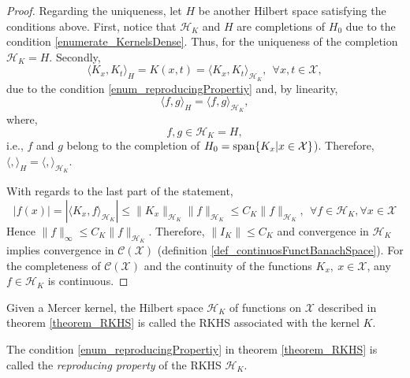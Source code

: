 \begin{theorem}
\begin{proof}
    Regarding the uniqueness, let $H$ be another Hilbert space satisfying the conditions above. First, notice that $\mathcal{H}_K$ and $H$ are completions of $H_0$ due to the condition \ref{enumerate_KernelsDense}. Thus, for the uniqueness of the completion $\mathcal{H}_K = H$. Secondly,
    \begin{equation*}
      \langle K_x,K_t \rangle_H = K(x,t) = \langle K_x,K_t \rangle_{\mathcal{H}_K}, \ \ \forall x,t \in \mathcal{X},
    \end{equation*}
    due to the condition \ref{enum_reproducingPropertiy} and, by linearity,
    \begin{equation*}
      \langle f,g \rangle_H = \langle f,g \rangle_{\mathcal{H}_K},
    \end{equation*}
    where,
    \begin{equation*} 
    f,g \in \mathcal{H}_K = H,
    \end{equation*}
    i.e., $f$ and $g$ belong to the completion of $H_0 = \textup{span}\{ K_x | x \in \mathcal{X} \}$). Therefore, $\langle , \rangle_H = \langle , \rangle_{\mathcal{H}_K}$.

    With regards to the last part of the statement,
    \begin{equation*}
      |f(x)| = |\langle K_x,f \rangle_{\mathcal{H}_K}| \leq 
                     \|K_x\|_{\mathcal{H}_K} \|f\|_{\mathcal{H}_K} 
                     \leq C_K \|f\|_{\mathcal{H}_K}, \ \ 
                     \forall f \in \mathcal{H}_K, \forall x \in \mathcal{X}
    \end{equation*}
    Hence $\|f\|_{\infty} \leq C_K \|f\|_{\mathcal{H}_K}$. Therefore, $\|I_K\| \leq C_K$ and convergence in $\mathcal{H}_K$ implies convergence in $\mathcal{C}(\mathcal{X})$ (definition \ref{def_continuosFunctBanachSpace}). For the completeness of $\mathcal{C}(\mathcal{X})$ and the continuity of the functions $K_x, \ x \in \mathcal{X}$, any $f \in \mathcal{H}_K$ is continuous. 
  \end{proof}
\end{theorem}

\begin{remark}
  Given a Mercer kernel, the Hilbert space $\mathcal{H}_K$ of functions on $\mathcal{X}$ described in theorem \ref{theorem_RKHS} is called the RKHS associated with the kernel $K$.
\end{remark}

\begin{remark}
  The condition \ref{enum_reproducingPropertiy} in theorem \ref{theorem_RKHS} is called the \emph{reproducing property} of the RKHS $\mathcal{H}_K$.
\end{remark}


